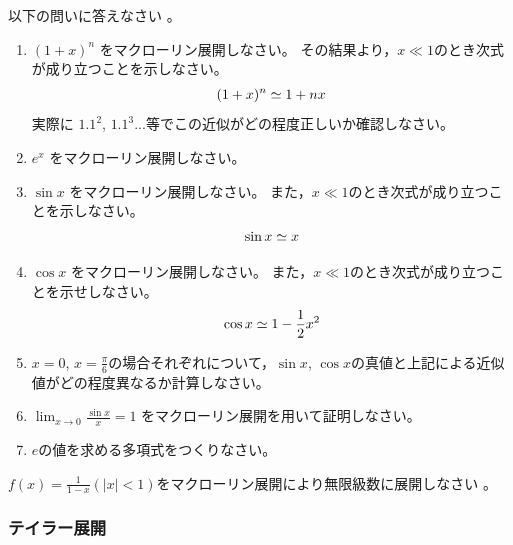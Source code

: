\documentclass[twocolumn,11pt]{jarticle}
\begin{document}
\nquestion
以下の問いに答えなさい
。
\begin{enumerate}
\item\label{itemM:(1+x)^n} $(1+x)^n$ をマクローリン展開しなさい。
その結果より，$x\ll 1$のとき次式が成り立つことを示しなさい。
\begin{align}
  (1+x)^n\simeq 1+nx\notag
\end{align}
実際に $1.1^2$, $1.1^3$...等でこの近似がどの程度正しいか確認しなさい。
\item\label{itemM:Me^x} $e^x$ をマクローリン展開しなさい。
\item\label{itemM:sinx} $\sin x$ をマクローリン展開しなさい。
  また，$x\ll 1$のとき次式が成り立つことを示しなさい。
  \begin{align}
    \sin x\simeq x\notag
  \end{align}
\item\label{itemM:cosx} $\cos x$ をマクローリン展開しなさい。
  また，$x\ll 1$のとき次式が成り立つことを示せしなさい。
  \begin{align}
    \cos x\simeq 1-\frac{1}{2}x^2\notag
  \end{align}
\item $x=0$, $x=\frac{\pi}{6}$の場合それぞれについて，$\sin x$, $\cos x$の真値と上記による近似値がどの程度異なるか計算しなさい。
\item $\displaystyle \lim_{x\to 0}\frac{\sin x}{x}=1$
  をマクローリン展開を用いて証明しなさい。
\item $e$の値を求める多項式をつくりなさい。
\end{enumerate}

\exercise
$\displaystyle f(x)=\frac{1}{1-x}$\quad$(|x|<1)$をマクローリン展開により無限級数に展開しなさい
。


\subsubsection{テイラー展開}
\end{document}
